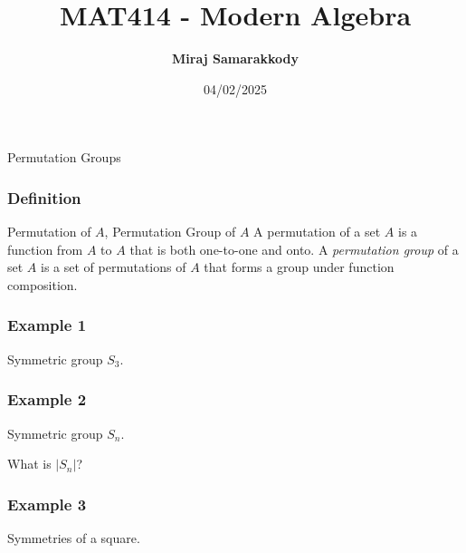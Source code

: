 \documentclass{beamer}
\title{MAT414 - Modern Algebra}
\author{\textbf{Miraj Samarakkody}}
\institute{Tougaloo College}
\date{04/02/2025}
\begin{document}
\begin{frame}
    \titlepage
\end{frame}


\begin{frame}
    \frametitle{}

    \Huge{Permutation Groups}

\end{frame}

\begin{frame}
    \frametitle{Definition}

    \begin{block}{Permutation of \(A\), Permutation Group of \(A\)}
        A permutation of a set \(A\) is a function from \(A\) to \(A\) that is both one-to-one and onto. A \textit{permutation group} of a set \(A\) is a set of permutations of \(A\) that forms a group under function composition. 
    \end{block}

\end{frame}

\begin{frame}
    \frametitle{Example 1}

    Symmetric group \(S_3\). 

\end{frame}

\begin{frame}
    \frametitle{Example 2}

    Symmetric group \(S_n\). \pause 

    What is \(|S_n|\)? 

\end{frame}


\begin{frame}
    \frametitle{Example 3}

    Symmetries of a square. 

\end{frame}
\end{document}
